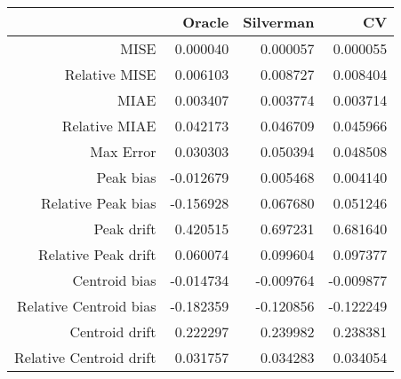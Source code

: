 \begin{tabular}{rrrr}
  \hline
 & Oracle & Silverman & CV \\ 
  \hline
MISE & 0.000040 & 0.000057 & 0.000055 \\ 
  Relative MISE & 0.006103 & 0.008727 & 0.008404 \\ 
  MIAE & 0.003407 & 0.003774 & 0.003714 \\ 
  Relative MIAE & 0.042173 & 0.046709 & 0.045966 \\ 
  Max Error & 0.030303 & 0.050394 & 0.048508 \\ 
  Peak bias & -0.012679 & 0.005468 & 0.004140 \\ 
  Relative Peak bias & -0.156928 & 0.067680 & 0.051246 \\ 
  Peak drift & 0.420515 & 0.697231 & 0.681640 \\ 
  Relative Peak drift & 0.060074 & 0.099604 & 0.097377 \\ 
  Centroid bias & -0.014734 & -0.009764 & -0.009877 \\ 
  Relative Centroid bias & -0.182359 & -0.120856 & -0.122249 \\ 
  Centroid drift & 0.222297 & 0.239982 & 0.238381 \\ 
  Relative Centroid drift & 0.031757 & 0.034283 & 0.034054 \\ 
   \hline
\end{tabular}
